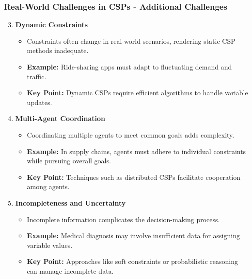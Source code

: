 \documentclass[aspectratio=169]{beamer}
\begin{document}
\begin{frame}[fragile]
    \frametitle{Real-World Challenges in CSPs - Additional Challenges}
    \begin{enumerate}
        \setcounter{enumi}{2} %
        \item \textbf{Dynamic Constraints}
            \begin{itemize}
                \item Constraints often change in real-world scenarios, rendering static CSP methods inadequate.
                \item \textbf{Example:} Ride-sharing apps must adapt to fluctuating demand and traffic.
                \item \textbf{Key Point:} Dynamic CSPs require efficient algorithms to handle variable updates.
            \end{itemize}
        \item \textbf{Multi-Agent Coordination}
            \begin{itemize}
                \item Coordinating multiple agents to meet common goals adds complexity.
                \item \textbf{Example:} In supply chains, agents must adhere to individual constraints while pursuing overall goals.
                \item \textbf{Key Point:} Techniques such as distributed CSPs facilitate cooperation among agents.
            \end{itemize}
        \item \textbf{Incompleteness and Uncertainty}
            \begin{itemize}
                \item Incomplete information complicates the decision-making process.
                \item \textbf{Example:} Medical diagnosis may involve insufficient data for assigning variable values.
                \item \textbf{Key Point:} Approaches like soft constraints or probabilistic reasoning can manage incomplete data.
            \end{itemize}
    \end{enumerate}
\end{frame}
\end{document}
